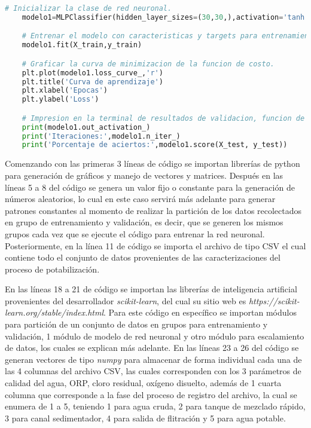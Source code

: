 \begin{lstlisting}[language=Python]
	# Inicializar la clase de red neuronal.
	modelo1=MLPClassifier(hidden_layer_sizes=(30,30,),activation='tanh',solver='sgd',learning_rate='constant', learning_rate_init=0.3,max_iter=70,random_state=(10))

	# Entrenar el modelo con caracteristicas y targets para entrenamiento. 
	modelo1.fit(X_train,y_train)

	# Graficar la curva de minimizacion de la funcion de costo. 
	plt.plot(modelo1.loss_curve_,'r')
	plt.title('Curva de aprendizaje')
	plt.xlabel('Epocas')
	plt.ylabel('Loss')

	# Impresion en la terminal de resultados de validacion, funcion de activacion en capa de salida y epocas en entrenamiento.
	print(modelo1.out_activation_)
	print('Iteraciones:',modelo1.n_iter_)
	print('Porcentaje de aciertos:',modelo1.score(X_test, y_test))
\end{lstlisting}

Comenzando con las primeras 3 líneas de código se importan librerías de python para generación de gráficos y manejo de vectores y matrices. Después en las líneas 5 a 8 del código se genera un valor fijo o constante para 
la generación de números aleatorios, lo cual en este caso servirá más adelante para generar patrones constantes al momento de realizar la partición de los datos recolectados en grupo de entrenamiento y validación, es decir,
que se generen los mismos grupos cada vez que se ejecute el código para entrenar la red neuronal. Posteriormente, en la línea 11 de código se importa el archivo de tipo CSV el cual contiene todo el conjunto de datos provenientes 
de las caracterizaciones del proceso de potabilización.

En las líneas 18 a 21 de código se importan las librerías de inteligencia artificial provenientes del desarrollador \textit{scikit-learn}, del cual su sitio web es \textit{https://scikit-learn.org/stable/index.html}. Para este 
código en específico se importan módulos para partición de un conjunto de datos en grupos para entrenamiento y validación, 1 módulo de modelo de red neuronal y otro módulo para escalamiento de datos, los cuales se explican 
más adelante. En las líneas 23 a 26 del código se generan vectores de tipo \textit{numpy} para almacenar de forma individual cada una de las 4 columnas del archivo CSV, las cuales corresponden con los 3 parámetros de calidad 
del agua, ORP, cloro residual, oxígeno disuelto, además de 1 cuarta columna que corresponde a la fase del proceso de registro del archivo, la cual se enumera de 1 a 5, teniendo 1 para agua cruda, 2 para tanque de mezclado 
rápido, 3 para canal sedimentador, 4 para salida de flitración y 5 para agua potable.


